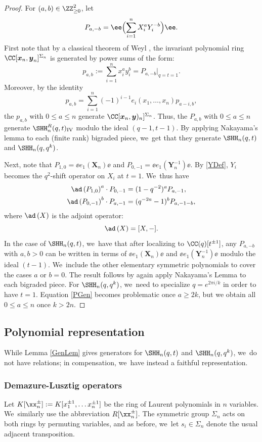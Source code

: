 \begin{proof}
For $(a,b)\in\ZZ_{\ge 0}^2$, let
\[
P_{a,-b}=\ee\Bigl(\sum_{i=1}^nX_i^aY_i^{-b}\Bigr)\ee.
\]
First note that by a classical theorem of Weyl \cite{WeylInv}, the invariant polynomial ring $\CC[\boldsymbol{x}_n,\boldsymbol{y}_n]^{\Sigma_n}$ is generated by power sums of the form:
\[
p_{a,b}:=\sum_{i=1}^n x_i^ay_i^{b}=P_{a,-b}\big|_{q=t=1}.
\]
Moreover, by the identity
\[
p_{a,b}=\sum_{i=1}^n(-1)^{i-1}e_i(x_1,\ldots, x_n)p_{a-i,b},
\]
the $p_{a,b}$ with $0\le a\le n$ generate $\CC[\boldsymbol{x}_n,\boldsymbol{y})_n]^{\Sigma_n}$.
Thus, the $P_{a,b}$ with $0\le a\le n$ generate $\SHH_n^R(q,t)_{\mathrm{IV}}$ modulo the ideal $(q-1, t-1)$.
By applying Nakayama's lemma to each (finite rank) bigraded piece, we~get that they generate $\SHH_n(q,t)$ and $\SHH_n(q,q^k)$.

Next, note that $P_{1,0}=\ee e_1(\boldsymbol{X}_n)\ee$ and $P_{0,-1}=\ee e_1(\boldsymbol{Y}_n^{-1})\ee$.
By \eqref{YDef}, $Y_i$ becomes the $q^2$-shift operator on $X_i$ at $t=1$. We~thus have
\begin{align}
\nonumber
\ad\left(P_{1,0} \right)^a\cdot P_{0,-1}&= (1-q^{-2})^aP_{a, -1},\\
\ad\left(P_{0,-1} \right)^b \cdot P_{a, -1}&= (q^{-2a}-1)^bP_{a, -1-b},
\label{PGen}
\end{align}
where $\ad\left(X \right)$ is the adjoint operator:
\[
\ad\left(X \right)=[X,-].
\]
In the case of $\SHH_n(q,t)$, we~have that after localizing to $\CC(q)[t^{\pm 1}]$, any $P_{a,-b}$ with $a,b>0$ can be written in terms of $\ee e_1(\boldsymbol{X}_n)\ee$ and $\ee e_1(\boldsymbol{Y}_n^{-1})\ee$ modulo the ideal $(t-1)$. We~include the other elementary symmetric polynomials to cover the cases $a$ or $b=0$.
The result follows by again apply Nakayama's Lemma to each bigraded piece.
For $\SHH_n(q,q^k)$, we~need to specialize $q=e^{2\pi i/k}$ in order to have $t=1$.
Equation \eqref{PGen} becomes problematic once $a\ge 2k$, but we obtain all $0\le a\le n$ once $k> 2n$.
\end{proof}

\subsection{Polynomial representation}\label{PolRep}
While Lemma \ref{GenLem} gives generators for $\SHH_n(q,t)$ and $\SHH_n(q,q^k)$, we~do not have relations; in compensation, we~have instead a faithful representation.

\subsubsection{Demazure-Lusztig operators}
Let $K[\xx_n^\pm]:=K[x_1^{\pm 1},\ldots x_{n}^{\pm 1}]$ be the ring of Laurent polynomials in $n$ variables. We~similarly use the abbreviation $R[\xx_n^\pm]$.
The symmetric group $\Sigma_n$ acts on both rings by permuting variables, and as before, we~let $s_i\in\Sigma_n$ denote the usual adjacent transposition.

